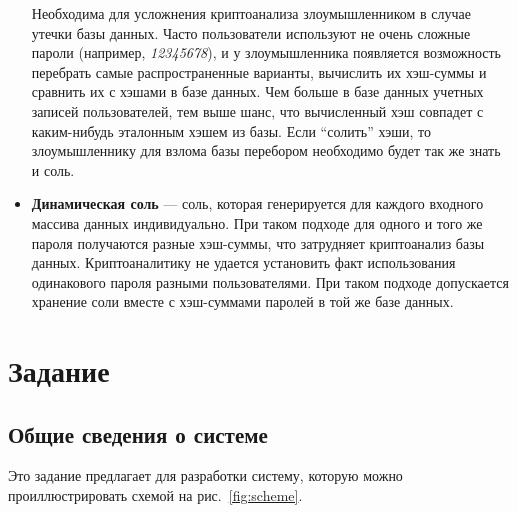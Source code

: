 \documentclass[14pt]{extarticle}
\begin{document}
\begin{itemize}
  
  Необходима для усложнения криптоанализа злоумышленником в случае утечки
  базы данных.
  Часто пользователи используют не очень сложные пароли (например,
  \textit{12345678}), и у злоумышленника появляется возможность перебрать
  самые распространенные варианты, вычислить их хэш-суммы и сравнить их с хэшами
  в базе данных\footnotemark{}.
  Чем больше в базе данных учетных записей пользователей, тем выше шанс, что
  вычисленный хэш совпадет с каким-нибудь эталонным хэшем из базы.
  Если \enquote{солить} хэши, то злоумышленнику для взлома базы перебором необходимо
  будет так же знать и соль.


 \item \textbf{Динамическая соль} --- соль, которая генерируется для каждого
  входного массива данных индивидуально.
  При таком подходе для одного и того же пароля получаются разные хэш-суммы,
  что затрудняет криптоанализ базы данных.
  Криптоаналитику не удается установить факт использования одинакового пароля
  разными пользователями.
  При таком подходе допускается хранение соли вместе с хэш-суммами паролей
  в той же базе данных.

\end{itemize}

\section{Задание}

\subsection{Общие сведения о системе}

Это задание предлагает для разработки систему, которую можно проиллюстрировать
схемой на рис.~\ref{fig:scheme}.
\end{document}
